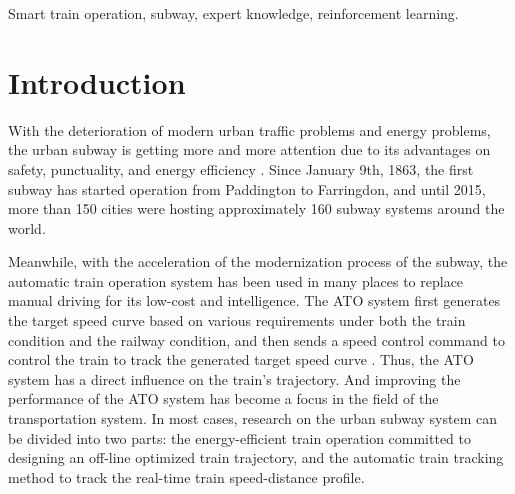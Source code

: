 \documentclass[journal]{IEEEtran}
\begin{document}
\begin{IEEEkeywords}
Smart train operation, subway, expert knowledge, reinforcement learning.
\end{IEEEkeywords}

\IEEEpeerreviewmaketitle
\section{Introduction}
With the deterioration of modern urban traffic problems and energy problems, the urban subway is getting more and more attention due to its advantages on safety, punctuality, and energy efficiency \cite{yin2016smart}. Since January 9th, 1863, the first subway has started operation from Paddington to Farringdon, and until 2015, more than 150 cities were hosting approximately 160 subway systems around the world. 

\par Meanwhile, with the acceleration of the modernization process of the subway, the automatic train operation system has been used in many places to replace manual driving for its low-cost and intelligence. The ATO system first generates the target speed curve based on various requirements under both the train condition and the railway condition, and then sends a speed control command to control the train to track the generated target speed curve \cite{corman2015review}. Thus, the ATO system has a direct influence on the train's trajectory. And improving the performance of the ATO system has become a focus in the field of the transportation system. In most cases, research on the urban subway system can be divided into two parts: the energy-efficient train operation committed to designing an off-line optimized train trajectory, and the automatic train tracking method to track the real-time train speed-distance profile.
\end{document}
